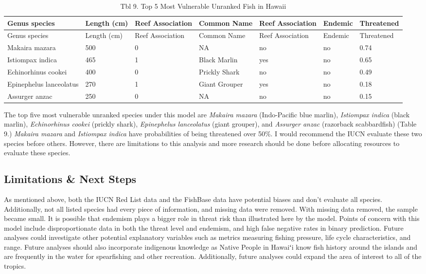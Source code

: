 \documentclass[
  letterpaper,
  DIV=11,
  numbers=noendperiod]{scrartcl}
\begin{document}
\begin{longtable}[]{@{}lllllll@{}}
\caption{Tbl 9. Top 5 Most Vulnerable Unranked Fish in
Hawaii}\tabularnewline
\toprule()
Genus species & Length (cm) & Reef Association & Common Name & Reef
Association & Endemic & Threatened \\
\midrule()
\endfirsthead
\toprule()
Genus species & Length (cm) & Reef Association & Common Name & Reef
Association & Endemic & Threatened \\
\midrule()
\endhead
Makaira mazara & 500 & 0 & NA & no & no & 0.74 \\
Istiompax indica & 465 & 1 & Black Marlin & yes & no & 0.65 \\
Echinorhinus cookei & 400 & 0 & Prickly Shark & no & no & 0.49 \\
Epinephelus lanceolatus & 270 & 1 & Giant Grouper & yes & no & 0.18 \\
Assurger anzac & 250 & 0 & NA & no & no & 0.15 \\
\bottomrule()
\end{longtable}

The top five most vulnerable unranked species under this model are
\emph{Makaira mazara} (Indo-Pacific blue marlin), \emph{Istiompax
indica} (black marlin), \emph{Echinorhinus cookei} (prickly shark),
\emph{Epinephelus lanceolatus} (giant grouper), and \emph{Assurger
anzac} (razorback scabbardfish) (Table 9.) \emph{Makaira mazara} and
\emph{Istiompax indica} have probabilities of being threatened over
50\%. I would recommend the IUCN evaluate these two species before
others. However, there are limitations to this analysis and more
research should be done before allocating resources to evaluate these
species.

\hypertarget{limitations-next-steps}{%
\subsection{Limitations \& Next Steps}\label{limitations-next-steps}}

As mentioned above, both the IUCN Red List data and the FishBase data
have potential biases and don't evaluate all species. Additionally, not
all listed species had every piece of information, and missing data were
removed. With missing data removed, the sample became small. It is
possible that endemism plays a bigger role in threat risk than
illustrated here by the model. Points of concern with this model include
disproportionate data in both the threat level and endemism, and high
false negative rates in binary prediction. Future analyses could
investigate other potential explanatory variables such as metrics
measuring fishing pressure, life cycle characteristics, and range.
Future analyses should also incorporate indigenous knowledge as Native
People in Hawaiʻi know fish history around the islands and are
frequently in the water for spearfishing and other recreation.
Additionally, future analyses could expand the area of interest to all
of the tropics.
\end{document}

